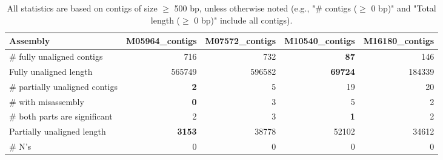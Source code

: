 \documentclass[12pt,a4paper]{article}
\begin{document}
\begin{table}[ht]
\begin{center}
\caption{All statistics are based on contigs of size $\geq$ 500 bp, unless otherwise noted (e.g., "\# contigs ($\geq$ 0 bp)" and "Total length ($\geq$ 0 bp)" include all contigs).}
\begin{tabular}{|l*{4}{|r}|}
\hline
Assembly & M05964\_contigs & M07572\_contigs & M10540\_contigs & M16180\_contigs \\ \hline
\# fully unaligned contigs & 716 & 732 & {\bf 87} & 146 \\ \hline
Fully unaligned length & 565749 & 596582 & {\bf 69724} & 184339 \\ \hline
\# partially unaligned contigs & {\bf 2} & 5 & 19 & 20 \\ \hline
\hspace{5mm}\# with misassembly & {\bf 0} & 3 & 5 & 2 \\ \hline
\hspace{5mm}\# both parts are significant & 2 & 3 & {\bf 1} & 2 \\ \hline
Partially unaligned length & {\bf 3153} & 38778 & 52102 & 34612 \\ \hline
\# N's & 0 & 0 & 0 & 0 \\ \hline
\end{tabular}
\end{center}
\end{table}
\end{document}
